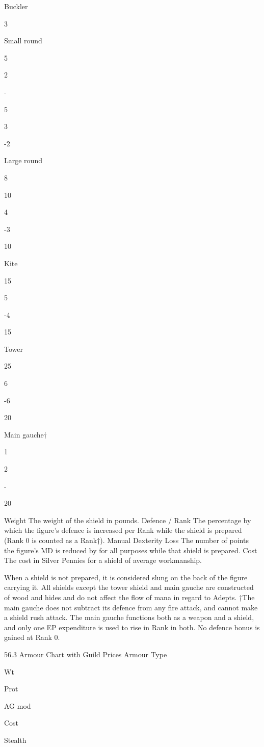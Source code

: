 \documentclass[a4paper]{article}
\begin{document}
\begin{multicols}{3}
Buckler

3

Small round

5

2%

-

5

3%

-2

Large round

8

10

4%

-3

10

Kite

15

5%

-4

15

Tower

25

6%

-6

20

Main gauche†

1

2%

-

20

Weight The weight of the shield in pounds.
Defence / Rank The percentage by which the
figure’s defence is increased per Rank while the
shield is prepared (Rank 0 is counted as a
Rank†).
Manual Dexterity Loss The number of points
the figure’s MD is reduced by for all purposes
while that shield is prepared.
Cost The cost in Silver Pennies for a shield of
average workmanship.

When a shield is not prepared, it is considered
slung on the back of the figure carrying it. All
shields except the tower shield and main gauche
are constructed of wood and hides and do not
affect the flow of mana in regard to Adepts.
†The main gauche does not subtract its defence
from any fire attack, and cannot make a shield
rush attack. The main gauche functions both as a
weapon and a shield, and only one EP expenditure is used to rise in Rank in both. No defence
bonus is gained at Rank 0.

56.3 Armour Chart with Guild Prices
Armour Type

Wt

Prot

AG mod

Cost

Stealth


\end{multicols}
\end{document}
